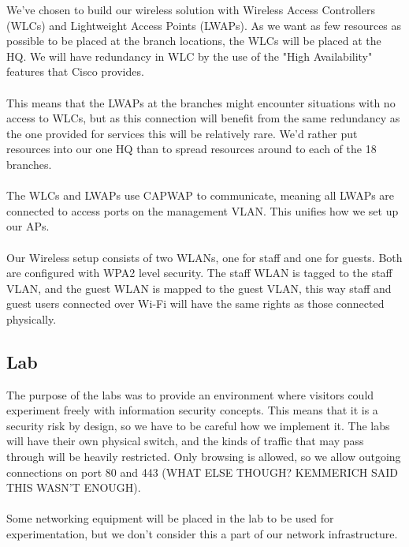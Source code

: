 We've chosen to build our wireless solution with Wireless Access Controllers (WLCs) and Lightweight Access Points (LWAPs). As we want as few resources as possible to be placed at the branch locations, the WLCs will be placed at the HQ. We will have redundancy in WLC by the use of the "High Availability" features that Cisco provides.
\\
\\
This means that the LWAPs at the branches might encounter situations with no access to WLCs, but as this connection will benefit from the same redundancy as the one provided for services this will be relatively rare. We'd rather put resources into our one HQ than to spread resources around to each of the 18 branches.
\\
\\
The WLCs and LWAPs use CAPWAP to communicate, meaning all LWAPs are connected to access ports on the management VLAN. This unifies how we set up our APs.
\\
\\
Our Wireless setup consists of two WLANs, one for staff and one for guests. Both are configured with WPA2 level security. The staff WLAN is tagged to the staff VLAN, and the guest WLAN is mapped to the guest VLAN, this way staff and guest users connected over Wi-Fi will have the same rights as those connected physically.

\subsection{Lab}


The purpose of the labs was to provide an environment where visitors could experiment freely with information security concepts. This means that it is a security risk by design, so we have to be careful how we implement it. The labs will have their own physical switch, and the kinds of traffic that may pass through will be heavily restricted. Only browsing is allowed, so we allow outgoing connections on port 80 and 443 (WHAT ELSE THOUGH? KEMMERICH SAID THIS WASN'T ENOUGH). 
\\
\\
Some networking equipment will be placed in the lab to be used for experimentation, but we don't consider this a part of our network infrastructure.


